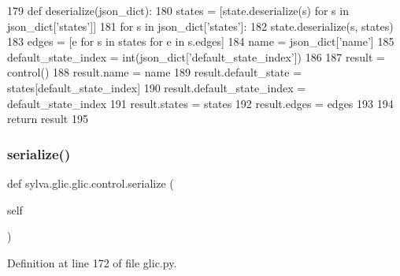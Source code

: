\begin{DoxyCode}
179         \textcolor{keyword}{def }deserialize(json\_dict):
180             states = [state.deserialize(s) \textcolor{keywordflow}{for} s \textcolor{keywordflow}{in} json\_dict[\textcolor{stringliteral}{'states'}]]
181             \textcolor{keywordflow}{for} s \textcolor{keywordflow}{in} json\_dict[\textcolor{stringliteral}{'states'}]:
182                 state.deserialize(s, states)
183             edges = [e \textcolor{keywordflow}{for} s \textcolor{keywordflow}{in} states \textcolor{keywordflow}{for} e \textcolor{keywordflow}{in} s.edges]
184             name = json\_dict[\textcolor{stringliteral}{'name'}]
185             default\_state\_index = int(json\_dict[\textcolor{stringliteral}{'default\_state\_index'}])
186 
187             result = control()
188             result.name = name
189             result.default\_state = states[default\_state\_index]
190             result.default\_state\_index = default\_state\_index
191             result.states = states
192             result.edges = edges
193 
194             \textcolor{keywordflow}{return} result
195 
\end{DoxyCode}
\mbox{\label{classsylva_1_1glic_1_1glic_1_1control_a5d7147d7ce52b8f9e3e96f3dfcba672f}} 
\subsubsection{\texorpdfstring{serialize()}{serialize()}}
{\footnotesize\ttfamily def sylva.\+glic.\+glic.\+control.\+serialize (\begin{DoxyParamCaption}\item[{}]{self }\end{DoxyParamCaption})}



Definition at line 172 of file glic.\+py.



